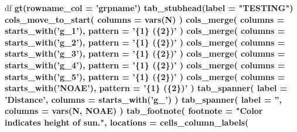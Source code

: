 \documentclass[]{article}
\newenvironment{Shaded}{\begin{snugshade}}{\end{snugshade}}
\newcommand{\DataTypeTok}[1]{\textcolor[rgb]{0.13,0.29,0.53}{#1}}
\newcommand{\KeywordTok}[1]{\textcolor[rgb]{0.13,0.29,0.53}{\textbf{#1}}}
\newcommand{\NormalTok}[1]{#1}
\newcommand{\OperatorTok}[1]{\textcolor[rgb]{0.81,0.36,0.00}{\textbf{#1}}}
\newcommand{\StringTok}[1]{\textcolor[rgb]{0.31,0.60,0.02}{#1}}
\begin{document}
\begin{Shaded}
\begin{Highlighting}[]
\NormalTok{df  }\OperatorTok{%>%}
\StringTok{  }\KeywordTok{gt}\NormalTok{(}\DataTypeTok{rowname_col =} \StringTok{'grpname'}\NormalTok{) }\OperatorTok{%>%}
\StringTok{  }\KeywordTok{tab_stubhead}\NormalTok{(}\DataTypeTok{label =} \StringTok{"TESTING"}\NormalTok{) }\OperatorTok{%>%}
\StringTok{  }\KeywordTok{cols_move_to_start}\NormalTok{(}
    \DataTypeTok{columns =} \KeywordTok{vars}\NormalTok{(N)}
\NormalTok{  ) }\OperatorTok{%>%}
\StringTok{  }\KeywordTok{cols_merge}\NormalTok{(}
    \DataTypeTok{columns =} \KeywordTok{starts_with}\NormalTok{(}\StringTok{'g_1'}\NormalTok{),}
    \DataTypeTok{pattern =} \StringTok{'\{1\} (\{2\})'}
\NormalTok{  ) }\OperatorTok{%>%}
\StringTok{  }\KeywordTok{cols_merge}\NormalTok{(}
    \DataTypeTok{columns =} \KeywordTok{starts_with}\NormalTok{(}\StringTok{'g_2'}\NormalTok{),}
    \DataTypeTok{pattern =} \StringTok{'\{1\} (\{2\})'}
\NormalTok{  ) }\OperatorTok{%>%}
\StringTok{  }\KeywordTok{cols_merge}\NormalTok{(}
    \DataTypeTok{columns =} \KeywordTok{starts_with}\NormalTok{(}\StringTok{'g_3'}\NormalTok{),}
    \DataTypeTok{pattern =} \StringTok{'\{1\} (\{2\})'}
\NormalTok{  ) }\OperatorTok{%>%}
\StringTok{  }\KeywordTok{cols_merge}\NormalTok{(}
    \DataTypeTok{columns =} \KeywordTok{starts_with}\NormalTok{(}\StringTok{'g_4'}\NormalTok{),}
    \DataTypeTok{pattern =} \StringTok{'\{1\} (\{2\})'}
\NormalTok{  ) }\OperatorTok{%>%}
\StringTok{  }\KeywordTok{cols_merge}\NormalTok{(}
    \DataTypeTok{columns =} \KeywordTok{starts_with}\NormalTok{(}\StringTok{'g_5'}\NormalTok{),}
    \DataTypeTok{pattern =} \StringTok{'\{1\} (\{2\})'}
\NormalTok{  ) }\OperatorTok{%>%}
\StringTok{  }\KeywordTok{cols_merge}\NormalTok{(}
    \DataTypeTok{columns =} \KeywordTok{starts_with}\NormalTok{(}\StringTok{'NOAE'}\NormalTok{),}
    \DataTypeTok{pattern =} \StringTok{'\{1\} (\{2\})'}
\NormalTok{  ) }\OperatorTok{%>%}
\StringTok{  }\KeywordTok{tab_spanner}\NormalTok{(}
    \DataTypeTok{label =} \StringTok{'Distance'}\NormalTok{,}
    \DataTypeTok{columns =} \KeywordTok{starts_with}\NormalTok{(}\StringTok{'g_'}\NormalTok{)}
\NormalTok{  ) }\OperatorTok{%>%}
\StringTok{  }\KeywordTok{tab_spanner}\NormalTok{(}
    \DataTypeTok{label =} \StringTok{''}\NormalTok{,}
    \DataTypeTok{columns =} \KeywordTok{vars}\NormalTok{(N, NOAE)}
\NormalTok{  ) }\OperatorTok{%>%}
\StringTok{  }\KeywordTok{tab_footnote}\NormalTok{(}
    \DataTypeTok{footnote =} \StringTok{"Color indicates height of sun."}\NormalTok{,}
    \DataTypeTok{locations =} \KeywordTok{cells_column_labels}\NormalTok{(}
}}}}}}}}}}}}
\end{Highlighting}
\end{Shaded}
\end{document}
